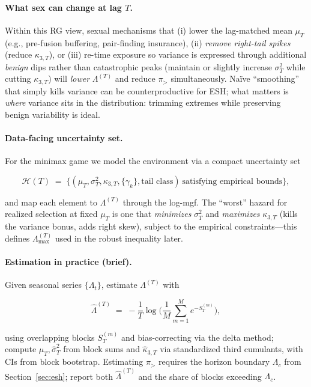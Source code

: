 \documentclass[11pt]{article}
\theoremstyle{upright}
\newcommand{\hazT}[1]{\Lambda^{(#1)}}          %
\begin{document}
\paragraph{What sex can change at lag $T$.}
Within this RG view, sexual mechanisms that (i) lower the lag-matched mean $\mu_T$ (e.g., pre-fusion buffering, pair-finding insurance), (ii) \emph{remove right-tail spikes} (reduce $\kappa_{3,T}$), or (iii) re-time exposure so variance is expressed through additional \emph{benign} dips rather than catastrophic peaks (maintain or slightly increase $\sigma_T^2$ while cutting $\kappa_{3,T}$) will \emph{lower} $\hazT{T}$ and reduce $\pi_{>}$ simultaneously. Naïve “smoothing” that simply kills variance can be counterproductive for ESH; what matters is \emph{where} variance sits in the distribution: trimming extremes while preserving benign variability is ideal.

\paragraph{Data-facing uncertainty set.}
For the minimax game we model the environment via a compact uncertainty set

$$
\mathcal H(T)\;=\;\Big\{(\mu_T,\sigma_T^2,\kappa_{3,T},\{\gamma_k\},\text{tail class})\ \text{satisfying empirical bounds}\Big\},
$$

and map each element to $\hazT{T}$ through the log-mgf. The “worst” hazard for realized selection at fixed $\mu_T$ is one that \emph{minimizes} $\sigma_T^2$ and \emph{maximizes} $\kappa_{3,T}$ (kills the variance bonus, adds right skew), subject to the empirical constraints—this defines $\hazT{T}_{\max}$ used in the robust inequality later.

\paragraph{Estimation in practice (brief).}
Given seasonal series $\{\Lambda_t\}$, estimate $\hazT{T}$ with

$$
\widehat{\Lambda}^{(T)}\;=\;-\frac{1}{T}\log\Big(\frac{1}{M}\sum_{m=1}^{M} e^{-S_T^{(m)}}\Big),
$$

using overlapping blocks $S_T^{(m)}$ and bias-correcting via the delta method; compute $\hat\mu_T,\hat\sigma_T^2$ from block sums and $\hat\kappa_{3,T}$ via standardized third cumulants, with CIs from block bootstrap. Estimating $\pi_{>}$ requires the horizon boundary $\Lambda_c$ from Section~\ref{sec:esh}; report both $\widehat{\Lambda}^{(T)}$ and the share of blocks exceeding $\Lambda_c$.
\end{document}

